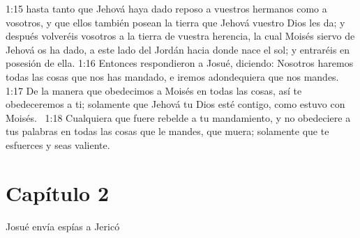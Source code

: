 1:15 hasta tanto que Jehová haya dado reposo a vuestros hermanos como a vosotros, y que ellos también posean la tierra que Jehová vuestro Dios les da; y después volveréis vosotros a la tierra de vuestra herencia, la cual Moisés siervo de Jehová os ha dado, a este lado del Jordán hacia donde nace el sol; y entraréis en posesión de ella. 
1:16 Entonces respondieron a Josué, diciendo: Nosotros haremos todas las cosas que nos has mandado, e iremos adondequiera que nos mandes.  
1:17 De la manera que obedecimos a Moisés en todas las cosas, así te obedeceremos a ti; solamente que Jehová tu Dios esté contigo, como estuvo con Moisés.  
1:18 Cualquiera que fuere rebelde a tu mandamiento, y no obedeciere a tus palabras en todas las cosas que le mandes, que muera; solamente que te esfuerces y seas valiente.  
\section*{Capítulo 2}
Josué envía espías a Jericó  


